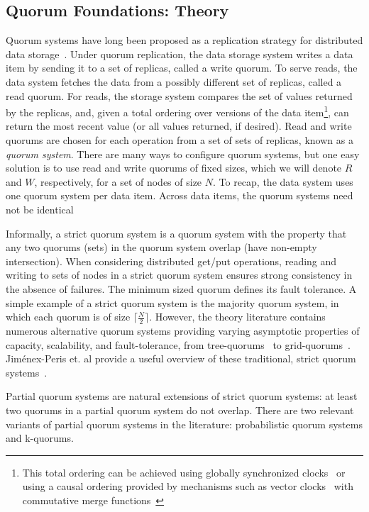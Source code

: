 \documentclass{vldb}
\newcommand{\subsectionskip}{-0em}
\begin{document}
\vspace{\subsectionskip}\subsection{Quorum Foundations: Theory}

Quorum systems have long been proposed as a replication strategy for
distributed data storage~\cite{quorums-start}.  Under quorum
replication, the data storage system writes a data item by sending it
to a set of replicas, called a write quorum.  To serve reads, the data
system fetches the data from a possibly different set of replicas,
called a read quorum.  For reads, the storage system compares the set
of values returned by the replicas, and, given a total ordering over
versions of the data item\footnote{This total ordering can be achieved
  using globally synchronized clocks~\cite{synch-clocks} or using a
  causal ordering provided by mechanisms such as vector
  clocks~\cite{vectorclock} with commutative merge
  functions~\cite{cops}}, can return the most recent value (or all
values returned, if desired).  Read and write quorums are chosen for
each operation from a set of sets of replicas, known as a
\textit{quorum system}.  There are many ways to configure quorum
systems, but one easy solution is to use read and write quorums of
fixed sizes, which we will denote $R$ and $W$, respectively, for a set
of nodes of size $N$.  To recap, the data system uses one quorum
system per data item.  Across data items, the quorum systems need not
be identical

Informally, a strict quorum system is a quorum system with the
property that any two quorums (sets) in the quorum system overlap
(have non-empty intersection). When considering distributed get/put
operations, reading and writing to sets of nodes in a strict quorum
system ensures strong consistency in the absence of failures.  The
minimum sized quorum defines its fault tolerance.  A simple example of
a strict quorum system is the majority quorum system, in which each
quorum is of size $\lceil \frac{N}{2}\rceil$.  However, the theory
literature contains numerous alternative quorum systems providing
varying asymptotic properties of capacity, scalability, and
fault-tolerance, from tree-quorums~\cite{treequorum} to
grid-quorums~\cite{quorumsystems}.  Jim\'{e}nex-Peris et. al provide a
useful overview of these traditional, strict quorum
systems~\cite{quorums-alternative}.

Partial quorum systems are natural extensions of strict quorum
systems: at least two quorums in a partial quorum system do not
overlap.  There are two relevant variants of partial quorum systems in
the literature: probabilistic quorum systems and k-quorums.
\end{document}

